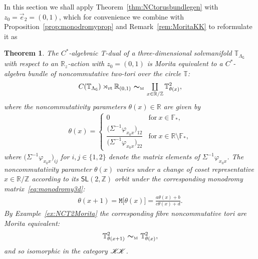 \documentclass[pdftex]{sigma}
\numberwithin{equation}{section}
\newcommand{\Z}{\zed}
\newcommand{\F}{\mathbb{F}}
\newcommand{\mbf}[1]{{\boldsymbol {#1} }}
\newcommand{\CCK}{\mathscr{K}}
\newcommand{\sfG}{\mathsf{G}}
\newcommand{\sfSL}{\mathsf{SL}}
\newcommand{\ttM}{\mathtt{M}}
\newcommand{\rt}{{\rm rt}}
\newcommand{\mcoprod}{\mbox{$\coprod\limits_{x\in\R/\Z}$}}
\newcommand{\R}{\real}
\newcommand{\zed}{{\mathbb Z}} %
\newcommand{\real}{{\mathbb R}} %
\newcommand{\torus}{{\mathbb T}} %
\newtheorem{Theorem}{Theorem}[section]
\begin{document}
In this section we shall apply Theorem~\ref{thm:NCtorusbundlegen} with
$z_0=\vec e_2=(0,1)$, which for convenience we combine with
Proposition~\ref{prop:monodromyprop} and Remark~\ref{rem:MoritaKK} to reformulate it as
\begin{Theorem}\label{thm:NCtorusbundle3d}
The $C^*$-algebraic T-dual of a three-dimensional
solvmanifold $\torus_{\Lambda_\sfG}$ with respect to an $\R_z$-action
with $z_0=(0,1)$
is Morita equivalent to a $C^*$-algebra bundle
of noncommutative two-tori over the circle $\torus$:
\begin{gather*}%
C(\torus_{\Lambda_\sfG})\rtimes_\rt\real_{(0,1)}
\ \mbf\sim_{\text{\tiny M}} \ \mcoprod \,
\torus^2_{\theta(x)} ,
\end{gather*}
where the noncommutativity parameters $\theta(x)\in\R$ are given by
\begin{gather*}%
\theta(x) = \begin{cases}
 0 & \mbox{for} \ x \in \F_* , \\
\dfrac{\big(\Sigma^{-1} \varphi_{x_0 x}\big)_{12}}{\big(\Sigma^{-1} \varphi_{x_0 x}\big)_{22}}
 & \mbox{for} \ x\in\R\setminus\F_* , \end{cases}
\end{gather*}
where $\big(\Sigma^{-1} \varphi_{x_0 x}\big)_{ij}$ for $i,j\in\{1,2\}$ denote
the matrix elements of $\Sigma^{-1} \varphi_{x_0 x}$. The
noncommutativity parameter $\theta(x)$ varies under a
change of coset representative $x\in\R/\Z$
according to its $\sfSL(2,\Z)$ orbit under the corresponding monodromy
matrix~\eqref{eq:monodromy3d}:
\begin{gather}\label{eq:thetaMorita3d}
\theta(x+1) = \ttM\big[\theta(x)\big] =
\frac{a \theta(x)+b}{c \theta(x)+d} .
\end{gather}
By Example~{\rm \ref{ex:NCT2Morita}} the corresponding fibre noncommutative
tori are Morita equivalent:
\[
\torus^2_{\theta(x+1)} \ \mbf\sim_{\text{\tiny
 M}} \ \torus^2_{\theta(x)},
\]
and so isomorphic in the category ${\CCK\hspace{-1mm}\CCK}$.
\end{Theorem}
\end{document}
